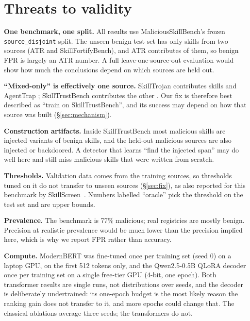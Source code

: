 \section{Threats to validity}
\label{sec:threats}
\textbf{One benchmark, one split.} All results use MaliciousSkillBench's frozen \texttt{source\_disjoint}
split. The unseen benign test set has only \TestBenign{} skills from two sources (ATR and SkillFortifyBench),
and ATR contributes \TestAtrBenign{} of them, so benign FPR is largely an ATR number. A full
leave-one-source-out evaluation would show how much the conclusions depend on which sources are held out.

\textbf{``Mixed-only'' is effectively one source.} SkillTrojan contributes \MixedSkillTrojan{} skills and
AgentTrap \MixedAgentTrap{}; SkillTrustBench contributes the other \MixedSkillTrustBench{}. Our fix is therefore
best described as ``train on SkillTrustBench'', and its success may depend on how that source was built
(\S\ref{sec:mechanism}).

\textbf{Construction artifacts.} Inside SkillTrustBench most malicious skills are injected variants of benign
skills, and the held-out malicious sources are also injected or backdoored. A detector that learns ``find the
injected span'' may do well here and still miss malicious skills that were written from scratch.

\textbf{Thresholds.} Validation data comes from the training sources, so thresholds tuned on it do not
transfer to unseen sources (\S\ref{sec:fix}), as also reported for this benchmark by
SkillScreen~\cite{skillscreen2026}. Numbers labelled ``oracle'' pick the threshold on the test set and are
upper bounds.

\textbf{Prevalence.} The benchmark is 77\% malicious; real registries are mostly benign. Precision at
realistic prevalence would be much lower than the precision implied here, which is why we report FPR rather
than accuracy.

\textbf{Compute.} ModernBERT was fine-tuned once per training set (seed 0) on a laptop GPU, on the first 512
tokens only, and the Qwen2.5-0.5B QLoRA decoder once per training set on a single free-tier GPU (4-bit, one
epoch). Both transformer results are single runs, not distributions over seeds, and the decoder is
deliberately undertrained: its one-epoch budget is the most likely reason the ranking gain does not
transfer to it, and more epochs could change that. The classical ablations average three seeds; the
transformers do not.

